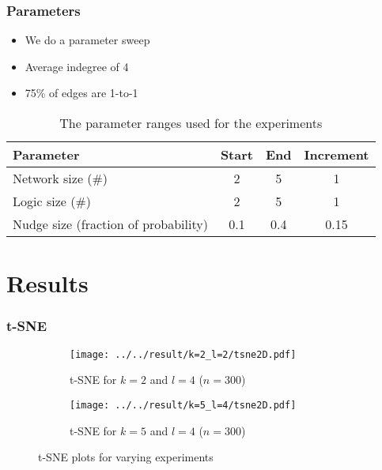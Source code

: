 \documentclass[hyperref={pdfpagelabels=false}]{beamer}
\begin{document}
\begin{frame}
\frametitle{Parameters}
\begin{itemize}
\item We do a parameter sweep
\item Average indegree of 4 \cite{lahdesmaki2003learning}
\item 75\% of edges are 1-to-1 
\end{itemize}
\begin{table}[H]
\begin{tabular}{| l | c | c | c |}
\hline
Parameter & Start & End & Increment \\
\hline
Network size (\#) & 2 & 5 & 1 \\
Logic size (\#) & 2 & 5 & 1 \\
Nudge size (fraction of probability) & 0.1 & 0.4 & 0.15 \\
\hline
\end{tabular}
\centering
\caption{The parameter ranges used for the experiments}
\label{parameters}
\end{table}
\end{frame}

\section{Results}
\setcounter{subsection}{1}

\begin{frame}
\frametitle{t-SNE}
\begin{figure}[ht]
    \centering
    \begin{subfigure}[b]{0.48\textwidth}
        \texttt{[image: ../../result/k=2\_l=2/tsne2D.pdf]}
        \caption{t-SNE for $k=2$ and $l=4$ ($n=300$)}
    \end{subfigure}
    \begin{subfigure}[b]{0.48\textwidth}
        \texttt{[image: ../../result/k=5\_l=4/tsne2D.pdf]}
        \caption{t-SNE for $k=5$ and $l=4$ ($n=300$)}
    \end{subfigure}
    \caption{t-SNE plots for varying experiments}
    \label{fig:TSNE}
\end{figure}
\end{frame}
\end{document}
